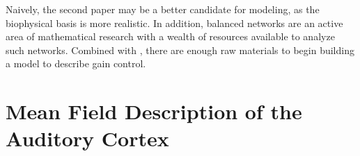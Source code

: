\documentclass[a4paper,12pt]{article}
\begin{document}
Naively, the second paper may be a better candidate for modeling, as the biophysical basis is more realistic. In addition, balanced networks are an active area of mathematical research with a wealth of resources available to analyze such networks. Combined with \cite{natan2017cortical}, there are enough raw materials to begin building a model to describe gain control.

\section{Mean Field Description of the Auditory Cortex}


 

\end{document}
